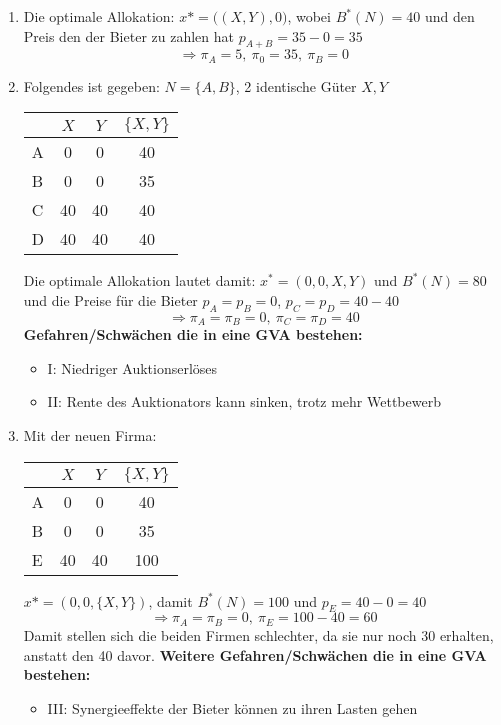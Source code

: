 \documentclass[12pt]{extreport} %
\theoremstyle{named}
\theoremstyle{nnamed}
\theoremstyle{itshape}
\theoremstyle{normal}
\begin{document}
\begin{enumerate}
	\item Die optimale Allokation: $x* = \big((X,Y), 0 \big)$, wobei $B^*(N) = 40$ und den Preis den der Bieter zu zahlen hat $p_{A+B} = 35 - 0 = 35$
		$$ \Rightarrow \pi_A = 5, ~\pi_0 = 35, ~\pi_B = 0 $$
	\item Folgendes ist gegeben: $N = \{ A, B \}$, 2 identische Güter $X, Y$
\begin{figure*}[hbt]	\centering
			\begin{tabular}{l|ccc}
 			 & $X$ & $Y$ & $\{X, Y \}$ \\
  				\hline
  			A & 0 & 0 & 40 \\
  			B & 0 & 0 & 35 \\
  			C & 40 & 40 & 40 \\
  			D & 40 & 40 & 40
		\end{tabular}
		\end{figure*}
		Die optimale Allokation lautet damit: $x^* = (0, 0, X, Y)$ und $B^*(N) = 80$ und die Preise für die Bieter $p_A = p_B = 0$, $p_C = p_D = 40 - 40$
		$$ \Rightarrow \pi_A = \pi_B = 0, ~ \pi_C = \pi_D = 40 $$
		\textbf{Gefahren/Schwächen die in eine GVA bestehen:}
		\begin{itemize}
			\item I: Niedriger Auktionserlöses
			\item II: Rente des Auktionators kann sinken, trotz mehr Wettbewerb
		\end{itemize}
	\item Mit der neuen Firma:
	\begin{figure*}[hbt]	\centering
			\begin{tabular}{l|ccc}
 			 & $X$ & $Y$ & $\{X, Y \}$ \\
  				\hline
  			A & 0 & 0 & 40 \\
  			B & 0 & 0 & 35 \\
  			E & 40 & 40 & 100
		\end{tabular}
		\end{figure*}
		$x* = (0, 0, \{X, Y \})$, damit $B^*(N) = 100$ und $p_E = 40 - 0 = 40$
		$$ \Rightarrow \pi_A = \pi_B = 0, ~ \pi_E = 100 - 40 = 60 $$
		Damit stellen sich die beiden Firmen schlechter, da sie nur noch 30 erhalten, anstatt den 40 davor.
			\textbf{Weitere Gefahren/Schwächen die in eine GVA bestehen:}
		\begin{itemize}
			\item III: Synergieeffekte der Bieter können zu ihren Lasten gehen
		\end{itemize}

\end{enumerate}
\end{document}
